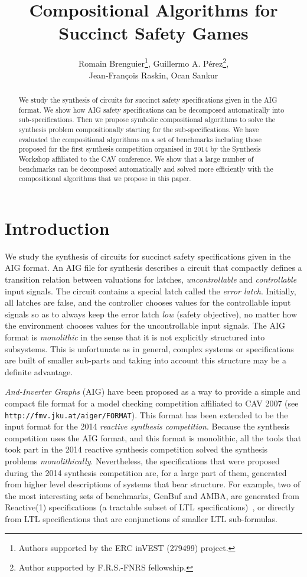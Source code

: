 \documentclass[submission,copyright,creativecommons]{eptcs}
\title{Compositional Algorithms for Succinct Safety Games}
\author{
Romain Brenguier\thanks{Authors supported by the ERC inVEST (279499) project.},
Guillermo A. P\'{e}rez\thanks{Author supported by F.R.S.-FNRS fellowship.},\\
Jean-Fran\c{c}ois Raskin\hspace{-1.7mm},
Ocan Sankur\\
\email{\{rbrengui,gperezme,jraskin,osankur\}@ulb.ac.be}
\institute{Universit\'{e} Libre de Bruxelles -- Brussels, Belgium}
}
\begin{document}
\maketitle

\begin{abstract}
We study the synthesis of circuits for succinct safety specifications given in
the AIG format.  We show how AIG safety specifications can be decomposed
automatically into sub-specifications.  Then we propose symbolic compositional
algorithms to solve the synthesis problem compositionally starting for the
sub-specifications.  We have evaluated the compositional algorithms on a set of
benchmarks including those proposed for the first synthesis competition
organised in 2014 by the Synthesis Workshop affiliated to the CAV
conference.  We show that a large number of benchmarks can be decomposed
automatically and solved more efficiently with the compositional algorithms that
we propose in this paper.
\end{abstract}

\section{Introduction}
We study the synthesis of circuits for succinct safety specifications given in
the AIG format.  An AIG file for synthesis describes a circuit that compactly
defines a transition relation between valuations for latches, {\em
uncontrollable} and {\em controllable} input signals.  The circuit contains a
special latch called the {\em error latch}.  Initially, all latches are false,
and the controller chooses values for the controllable input signals so as to
always keep the error latch {\em low} (safety objective), no matter how the
environment chooses values for the uncontrollable input signals. The AIG format
is {\em monolithic} in the sense that it is not explicitly structured into
subsystems.  This is unfortunate as in general, complex systems or
specifications are built of smaller sub-parts and taking into account this
structure may be a definite advantage. 

{\em And-Inverter Graphs} (AIG) have been proposed as a way to provide a simple
and compact file format for a model checking competition affiliated to CAV 2007
(see {\tt http://fmv.jku.at/aiger/FORMAT}). This format has been extended to be
the input format for the 2014 {\em reactive synthesis competition}.  Because the
synthesis competition uses the AIG format, and this format is monolithic, all
the tools that took part in the 2014 reactive synthesis competition solved the
synthesis problems {\em monolithically}. Nevertheless, the specifications that
were proposed during the 2014 synthesis competition are, for a large part of
them, generated from higher level descriptions of systems that bear structure.
For example, two of the most interesting sets of benchmarks, {\sf GenBuf} and
{\sf AMBA}, are generated from Reactive(1) specifications (a tractable subset of
LTL specifications)~\cite{BloemJPPS-jcss12}, or directly from LTL
specifications that are conjunctions of smaller LTL sub-formulas. 
   
\end{document}
